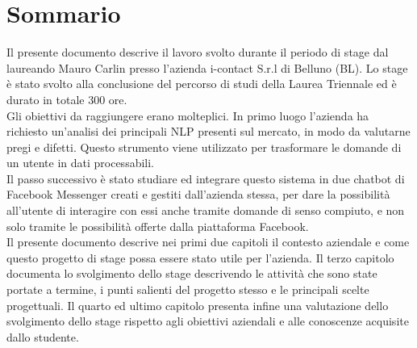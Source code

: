 
\cleardoublepage
{}
{}
\begingroup
\let\clearpage\relax
\let\cleardoublepage\relax
\let\cleardoublepage\relax

\chapter*{Sommario}

Il presente documento descrive il lavoro svolto durante il periodo di stage dal laureando Mauro Carlin presso l'azienda i-contact S.r.l di Belluno (BL). Lo stage è stato svolto alla conclusione del percorso di studi della Laurea Triennale ed è durato in totale 300 ore.\\
Gli obiettivi da raggiungere erano molteplici. In primo luogo l'azienda ha richiesto un'analisi dei principali \gls{NLP} presenti sul mercato, in modo da valutarne pregi e difetti. Questo strumento viene utilizzato per trasformare le domande di un utente in dati processabili.\\
Il passo successivo è stato studiare ed integrare questo sistema in due chatbot di Facebook Messenger creati e gestiti dall'azienda stessa, per dare la possibilità all'utente di interagire con essi anche tramite domande di senso compiuto, e non solo tramite le possibilità offerte dalla piattaforma Facebook.\\
Il presente documento descrive nei primi due capitoli il contesto aziendale e come questo progetto di stage possa essere stato utile per l'azienda. Il terzo capitolo documenta lo svolgimento dello stage descrivendo le attività che sono state portate a termine, i punti salienti del progetto stesso e le principali scelte progettuali. Il quarto ed ultimo capitolo presenta infine una valutazione dello svolgimento dello stage rispetto agli obiettivi aziendali e alle conoscenze acquisite dallo studente. 

%
%

\endgroup			

\vfill